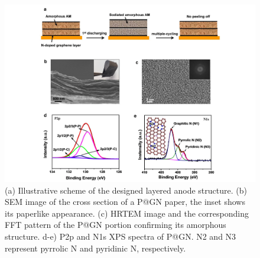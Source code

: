 \begin{figure}  
\includegraphics[width=340pt, angle=-90]{figures/figure4_1}
\caption[Layered structure design]
{(a) Illustrative scheme of the designed layered anode structure. (b) SEM image of the cross section of a P@GN paper, the inset shows its paperlike appearance. (c) HRTEM image and the corresponding FFT pattern of the P@GN portion confirming its amorphous structure. d-e) P2p and N1s XPS spectra of P@GN. N2 and N3 represent pyrrolic N and pyridinic N, respectively. 
\label{fig:4_1}}
\end{figure}

